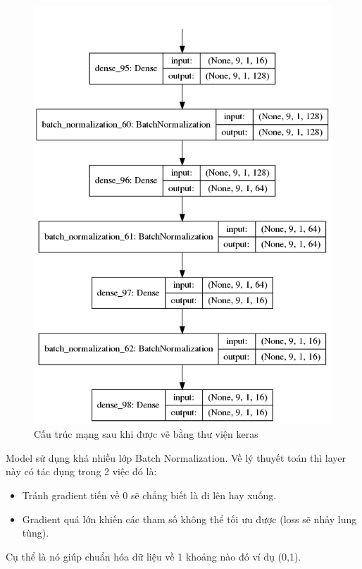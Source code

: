 \FloatBarrier
\begin{figure}[htp]
\begin{center}
\includegraphics[scale=0.9]{chap4/c4_figs/model.png}
\end{center}
\caption{Cấu trúc mạng sau khi được vẽ bằng thư viện keras}
\label{fig:model}
\end{figure}
\FloatBarrier

Model sử dụng khá nhiều lớp Batch Normalization. Về lý thuyết toán thì layer này có tác dụng trong 2 việc đó là:
\begin{itemize}
\item Tránh gradient tiến về 0 sẽ chẳng biết là đi lên hay xuống.
\item Gradient quá lớn khiến các tham số không thể tối ưu được (loss sẽ nhảy lung tùng).
\end{itemize}
Cụ thể là nó giúp chuẩn hóa dữ liệu về 1 khoảng nào đó ví dụ (0,1).

